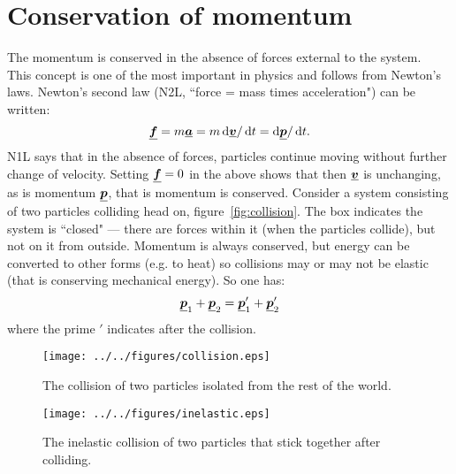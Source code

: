 \section{Conservation of momentum}
The momentum is conserved in the absence of forces external to the system.  \\
This concept is one of the most important in physics and follows from Newton's laws.  Newton's second law (N2L, ``force = mass times acceleration") can be written:
\begin{equation*} \mathit{\underline{\boldsymbol{f}}} = m \mathit{\underline{\boldsymbol{a}}} = m \operatorname{d}\!\mathit{\underline{\boldsymbol{v}}}/\operatorname{d}\! t = \operatorname{d}\!\mathit{\underline{\boldsymbol{p}}}/\operatorname{d}\! t .
\end{equation*}
N1L says that in the absence of forces, particles continue moving without further change of velocity.  Setting $\mathit{\underline{\boldsymbol{f}}}= 0$ in the above shows that then $\mathit{\underline{\boldsymbol{v}}}$ is unchanging, as is momentum $\mathit{\underline{\boldsymbol{p}}}$, that is momentum is conserved.\nll
Consider a system consisting of two particles colliding head on, figure~\ref{fig:collision}. The box indicates the system is ``closed" --- there are forces within it (when the particles collide), but not on it from outside.
\nll
Momentum is always conserved, but energy can be converted to other forms (e.g. to heat) so collisions may or may not be elastic (that is conserving mechanical energy).  So one has:
\begin{equation*} \mathit{\underline{\boldsymbol{p}}}_1 +  \mathit{\underline{\boldsymbol{p}}}_2 = \mathit{\underline{\boldsymbol{p}}}_1'  + \mathit{\underline{\boldsymbol{p}}}_2'
\end{equation*}
where the prime $'$ indicates after the collision.
\begin{figure}[h!]%
\centering
\begin{minipage}{.45\textwidth}
  \centering
  \texttt{[image: ../../figures/collision.eps]}
  \caption{The collision of two particles isolated from the rest of the world.}
  \label{fig:collision}
\end{minipage}\hfil
\begin{minipage}{.45\textwidth}
  \centering
  \texttt{[image: ../../figures/inelastic.eps]}
  \caption{The inelastic collision of two particles that stick together after colliding.}
  \label{fig:inelastic}
\end{minipage}
\end{figure}
\vspace{-0.5cm}
